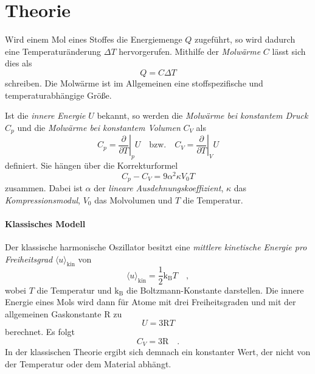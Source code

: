 


\section{Theorie}
Wird einem Mol eines Stoffes die Energiemenge $Q$ zugeführt, so wird dadurch eine
Temperaturänderung $\Delta T$ hervorgerufen. Mithilfe der \textit{Molwärme} $C$ lässt sich dies als 
\begin{equation}
Q = C \Delta T
\end{equation}
schreiben. Die Molwärme ist im Allgemeinen eine stoffspezifische und 
temperaturabhängige Größe.

Ist die \textit{innere Energie} $U$ bekannt, so werden die 
\textit{Molwärme bei konstantem Druck} $C_p$ und die 
\textit{Molwärme bei konstantem Volumen} $C_V$ als
\begin{equation}
C_p = \left. \frac{\partial}{\partial T} \right|_p U
\quad \text{bzw.} \quad 
C_V = \left. \frac{\partial}{\partial T} \right|_V U
\end{equation}
definiert. Sie hängen über die Korrekturformel 
\begin{equation}
C_p - C_V = 9 \alpha^2 \kappa V_0 T \label{eq:theorie:korrekturformel}
\end{equation}
zusammen. Dabei ist $\alpha$ der \textit{lineare Ausdehnungskoeffizient}, 
$\kappa$ das \textit{Kompressionsmodul}, $V_0$ das Molvolumen und $T$ die 
Temperatur.

\paragraph{Klassisches Modell}
	Der klassische harmonische Oszillator besitzt eine \textit{mittlere 
	kinetische 
	Energie 
	pro Freiheitsgrad} $\langle u \rangle_\text{kin}$ von
	\begin{equation}
	\langle u \rangle_\text{kin} = \frac{1}{2} \text{k}_\text{B} T \quad ,
	\end{equation}
	wobei $T$ die Temperatur und $\text{k}_\text{B}$ die Boltzmann-Konstante 
	darstellen. Die innere Energie eines Mols wird dann für Atome mit 
	drei Freiheitsgraden und mit der 
	allgemeinen Gaskonstante $\text{R}$ zu 
	\begin{equation}
	U = 3 \text{R} T
	\end{equation}
	berechnet. Es folgt 
	\begin{equation}
	C_V = 3 \text{R} \quad . \label{eq:theorie:C_klassisch}
	\end{equation}
	In der klassischen Theorie ergibt sich demnach ein konstanter Wert, 
	der nicht von der Temperatur oder dem Material abhängt.


